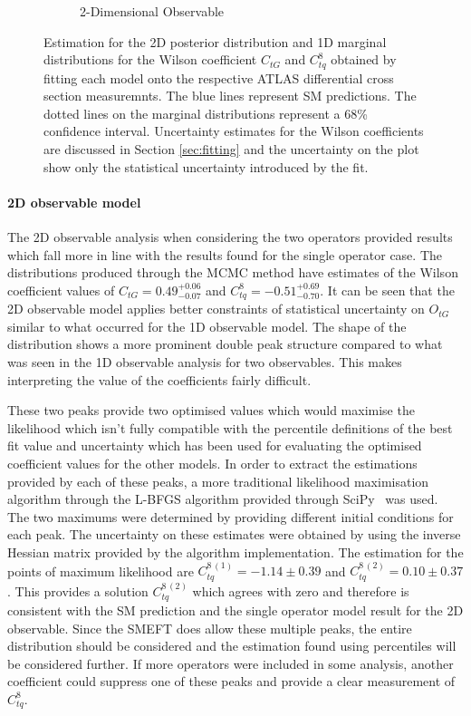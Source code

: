 \documentclass[a4paper,11pt]{article}
\begin{document}
\begin{figure}[htb]
\begin{subfigure}[b]{0.45\textwidth}
        \caption{2-Dimensional Observable}
        \label{fig:corner_2D_2OP}
    \end{subfigure}
    \centering
    \caption{Estimation for the 2D posterior distribution and 1D marginal distributions for the Wilson coefficient $C_{tG}$ and $C_{tq}^{8}$ obtained by fitting each model onto the respective ATLAS differential cross section measuremnts. The blue lines represent SM predictions. The dotted lines on the marginal distributions represent a 68\% confidence interval. Uncertainty estimates for the Wilson coefficients are discussed in Section \ref{sec:fitting} and the uncertainty on the plot show only the statistical uncertainty introduced by the fit.}
    \label{fig:corner_2OP}
\end{figure}

\paragraph{2D observable model}

The 2D observable analysis when considering the two operators provided results which fall more in line with the results found for the single operator case.
The distributions produced through the MCMC method have estimates of the Wilson coefficient values of $C_{tG}=0.49_{-0.07}^{+0.06}$ and $C_{tq}^{8}=-0.51_{-0.70}^{+0.69}$.
It can be seen that the 2D observable model applies better constraints of statistical uncertainty on $O_{tG}$ similar to what occurred for the 1D observable model.
The shape of the distribution shows a more prominent double peak structure compared to what was seen in the 1D observable analysis for two observables.
This makes interpreting the value of the coefficients fairly difficult. 

These two peaks provide two optimised values which would maximise the likelihood which isn't fully compatible with the percentile definitions of the best fit value and uncertainty which has been used for evaluating the optimised coefficient values for the other models.
In order to extract the estimations provided by each of these peaks, a more traditional likelihood maximisation algorithm through the L-BFGS algorithm provided through SciPy~\cite{2020SciPy-NMeth} was used.
The two maximums were determined by providing different initial conditions for each peak.
The uncertainty on these estimates were obtained by using the inverse Hessian matrix provided by the algorithm implementation.
The estimation for the points of maximum likelihood are $C_{tq}^{8\,(1)}=-1.14\pm0.39$ and $C_{tq}^{8\,(2)}=0.10\pm0.37$.
This provides a solution $C_{tq}^{8\,(2)}$ which agrees with zero and therefore is consistent with the SM prediction and the single operator model result for the 2D observable.
Since the SMEFT does allow these multiple peaks, the entire distribution should be considered and the estimation found using percentiles will be considered further.
If more operators were included in some analysis, another coefficient could suppress one of these peaks and provide a clear measurement of $C_{tq}^{8}$.
\end{document}
